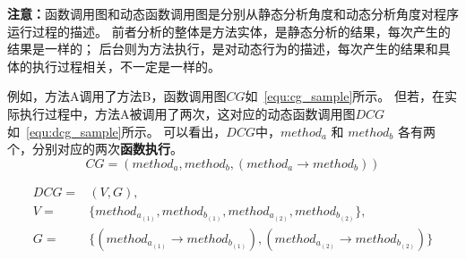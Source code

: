 \textbf{注意：}函数调用图和动态函数调用图是分别从静态分析角度和动态分析角度对程序运行过程的描述。
前者分析的整体是方法实体，是静态分析的结果，每次产生的结果是一样的；
后台则为方法执行，是对动态行为的描述，每次产生的结果和具体的执行过程相关，不一定是一样的。

例如，方法A调用了方法B，函数调用图$CG$如~\autoref{equ:cg_sample}所示。
但若，在实际执行过程中，方法A被调用了两次，这对应的动态函数调用图$DCG$如~\autoref{equ:dcg_sample}所示。
可以看出，$DCG$中，$method_a$ 和 $method_b$ 各有两个，分别对应的两次\textbf{函数执行}。
\begin{equation}
CG = ({method_a,method_b},{(method_a \to method_b )} ) \label{equ:cg_sample}
\end{equation}

\begin{equation}
\begin{aligned}
DCG = &(V,G) ,\\ 
V = & \{method_{a_{(1)}},method_{b_{(1)}},method_{a_{(2)}},method_{b_{(2)}}\}, \\ 
G = & \{  
    (  method_{a_{(1)}} \to method_{b_{(1)}}) ,( method_{a_{(2)}} \to method_{b_{(2)}})
 \} 
\end{aligned}
\label{equ:dcg_sample} 
\end{equation}






